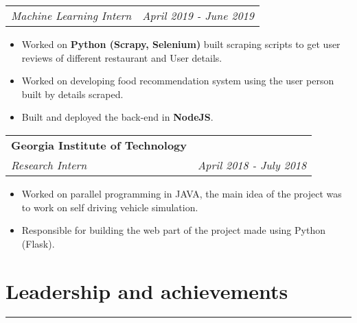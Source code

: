 \documentclass[a4paper,6pt]{article}
\begin{document}
\normalsize
\vspace{2px}
\hspace{5px}
\begin{tabularx}{\textwidth}{X r}
	\textit{\small Machine Learning Intern}& \textit{April 2019 - June 2019} \\
\end{tabularx}

\small
\begin{itemize}
	\itemsep0em
    \item Worked on \textcolor{mygray}{\textbf{Python (Scrapy, Selenium)}} built scraping scripts to get user reviews of different restaurant and User details.
    \item Worked on developing food recommendation system using the user person built by details scraped.
    \item Built and deployed the back-end in \textcolor{mygray}{\textbf{NodeJS}}.
\end{itemize}


\vspace{6px}
\hspace{5px}
\begin{tabularx}{\textwidth}{X r}
	\large{\textbf{Georgia Institute of Technology}} \vspace{2px} & \\
	\textit{\small Research Intern}& \textit{April 2018 - July 2018} \\
\end{tabularx}

\small
\begin{itemize}
	\itemsep0em
	\item Worked on parallel programming in JAVA, the main idea of the project was to work on self driving vehicle simulation.
	\item Responsible for building the web part of the project made using Python (Flask).
\end{itemize}



\vspace{-9px}
\section*{Leadership and achievements}
\vspace{-8px}
\hrule
\end{document}
